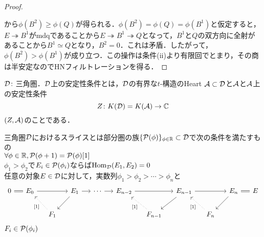 \begin{proof}
\begin{center}
\end{center}
から$\phi(B^2)\ge\phi(Q)$が得られる．$\phi(B^2)=\phi(Q)=\phi(B^1)$と仮定すると，$E\twoheadrightarrow B^1$がmdqであることから$E\twoheadrightarrow B^1\twoheadrightarrow Q$となって，$B^1$と$Q$の双方向に全射があることから$B^1\simeq Q$となり，$B^2=0$．これは矛盾．したがって，$\phi(B^2)>\phi(B^1)$が成り立つ．この操作は条件(ii)より有限回でとまり，その商は半安定なのでHNフィルトレーションを得る．
\end{proof}

\begin{defn}
	$\D\colon$三角圏．$\D$上の安定性条件とは，$\D$の有界な$t$-構造のHeart $\A\subset\D$と$\A$と$\A$上の安定性条件
	\[Z\colon K(\D)=K(\A)\to\CC\]
	$(Z,\A)$のことである．
\end{defn}

\begin{defn}
	三角圏$\D$におけるスライスとは部分圏の族$\{\P(\phi)\}_{\phi\in\RR}\subset\D$で次の条件を満たすもの\\
	\bullet $\forall\phi\in\RR, \P(\phi + 1) = \P(\phi)[1]$\\
	\bullet $\phi_1>\phi_2$で$E_i\in\P(\phi_i)$ならば$\Hom_{\D}(E_1,E_2)=0$\\
	\bullet 任意の対象$E\in\D$に対して，実数列$\phi_1>\phi_2>\cdots >\phi_n$と
	\[
		\begin{tikzcd}[column sep=1.3em]
			0\ar[r,equal]&E_0\ar[rr]& & E_{1}\ar[r]\ar[ld] &\cdots\ar[r] &E_{n-2}\ar[rr]&&E_{n-1}\ar[ld]\ar[rr]&&E_n\ar[ld]\ar[r,equal]&E\\
									 &&F_{1}\ar[lu,dotted,"{[1]}"] &&&&F_{n-1}\ar[lu,dotted,"{[1]}"]&&F_n\ar[lu,dotted,"{[1]}"]
		\end{tikzcd}
	\]
	$F_i\in\P(\phi_i)$
\end{defn}


